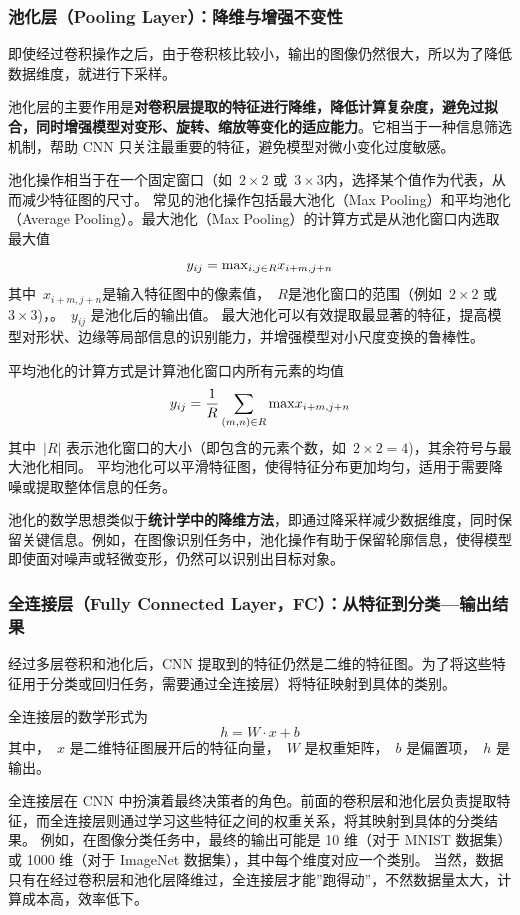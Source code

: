 
\subsubsection*{   池化层（Pooling Layer）：降维与增强不变性  }

即使经过卷积操作之后，由于卷积核比较小，输出的图像仍然很大，所以为了降低数据维度，就进行下采样。

池化层的主要作用是{\bf 对卷积层提取的特征进行降维，降低计算复杂度，避免过拟合，同时增强模型对变形、旋转、缩放等变化的适应能力}。它相当于一种信息筛选机制，帮助 CNN 只关注最重要的特征，避免模型对微小变化过度敏感。

池化操作相当于在一个固定窗口（如~$2\times 2$ 或~$ 3\times 3$内，选择某个值作为代表，从而减少特征图的尺寸。
常见的池化操作包括最大池化（Max Pooling）和平均池化（Average Pooling）。最大池化（Max Pooling）的计算方式是从池化窗口内选取最大值
$$
y_{ij}  ={\rm max}_{i,j \in R} x_{i+m, j+n}
$$
其中~$x_{i+m, j+n}$是输入特征图中的像素值，~$R$是池化窗口的范围（例如~$2\times 2$ 或~$ 3\times 3$)，。~$y_{ij}$ 是池化后的输出值。  
最大池化可以有效提取最显著的特征，提高模型对形状、边缘等局部信息的识别能力，并增强模型对小尺度变换的鲁棒性。

平均池化的计算方式是计算池化窗口内所有元素的均值
$$
y_{ij}  =\frac{1}{R} \sum_{(m,n)\in R}{\rm max} x_{i+m, j+n}
$$
其中~$|R|$ 表示池化窗口的大小（即包含的元素个数，如~$2\times 2=4$)，其余符号与最大池化相同。
平均池化可以平滑特征图，使得特征分布更加均匀，适用于需要降噪或提取整体信息的任务。

池化的数学思想类似于{\bf 统计学中的降维方法}，即通过降采样减少数据维度，同时保留关键信息。例如，在图像识别任务中，池化操作有助于保留轮廓信息，使得模型即使面对噪声或轻微变形，仍然可以识别出目标对象。

\subsubsection*{   全连接层（Fully Connected Layer，FC）：从特征到分类---输出结果}
经过多层卷积和池化后，CNN 提取到的特征仍然是二维的特征图。为了将这些特征用于分类或回归任务，需要通过全连接层）将特征映射到具体的类别。

全连接层的数学形式为
$$
h = W\cdot x + b
$$
其中，~$𝑥$ 是二维特征图展开后的特征向量，~$W$ 是权重矩阵，~$b$ 是偏置项，~$h$ 是输出。

全连接层在 CNN 中扮演着最终决策者的角色。前面的卷积层和池化层负责提取特征，而全连接层则通过学习这些特征之间的权重关系，将其映射到具体的分类结果。
例如，在图像分类任务中，最终的输出可能是 10 维（对于 MNIST 数据集）或 1000 维（对于 ImageNet 数据集），其中每个维度对应一个类别。
当然，数据只有在经过卷积层和池化层降维过，全连接层才能”跑得动”，不然数据量太大，计算成本高，效率低下。

